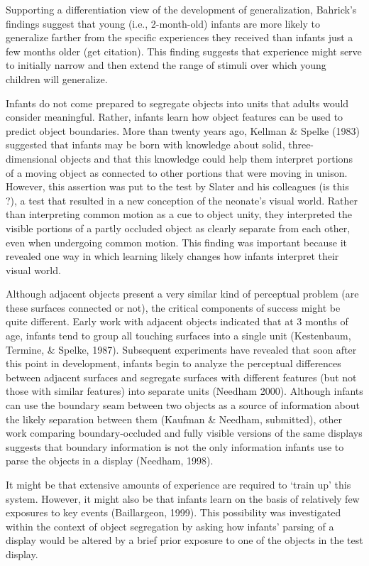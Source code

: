 Supporting a differentiation view of the development of
generalization, Bahrick's findings suggest that young (i.e.,
2-month-old) infants are more likely to generalize farther from the
specific experiences they received than infants just a few months
older (get citation).  This finding suggests that experience might
serve to initially narrow and then extend the range of stimuli over
which young children will generalize.


Infants do not come prepared to segregate objects into units that
adults would consider meaningful.  Rather, infants learn how object
features can be used to predict object boundaries.  More than twenty
years ago, Kellman \& Spelke (1983) suggested that infants may be born
with knowledge about solid, three-dimensional objects and that this
knowledge could help them interpret portions of a moving object as
connected to other portions that were moving in unison.  However, this
assertion was put to the test by Slater and his colleagues (is this
\cite{slater90newborn}?), a test that resulted in a new conception of
the neonate's visual world.  Rather than interpreting common motion as
a cue to object unity, they interpreted the visible portions of a
partly occluded object as clearly separate from each other, even when
undergoing common motion.  This finding was important because it
revealed one way in which learning likely changes how infants
interpret their visual world.


Although adjacent objects present a very similar kind of perceptual
problem (are these surfaces connected or not), the critical components
of success might be quite different.  Early work with adjacent objects
indicated that at 3 months of age, infants tend to group all touching
surfaces into a single unit (Kestenbaum, Termine, \& Spelke, 1987).
Subsequent experiments have revealed that soon after this point in
development, infants begin to analyze the perceptual differences
between adjacent surfaces and segregate surfaces with different
features (but not those with similar features) into separate units
(Needham 2000).  Although infants can use the boundary seam between
two objects as a source of information about the likely separation
between them (Kaufman \& Needham, submitted), other work comparing
boundary-occluded and fully visible versions of the same displays
suggests that boundary information is not the only information infants
use to parse the objects in a display (Needham, 1998).  


It might be that extensive amounts of experience are required to
`train up' this system.  However, it might also be that infants learn
on the basis of relatively few exposures to key events (Baillargeon,
1999).  This possibility was investigated within the context of object
segregation by asking how infants' parsing of a display would be
altered by a brief prior exposure to one of the objects in the test
display.



